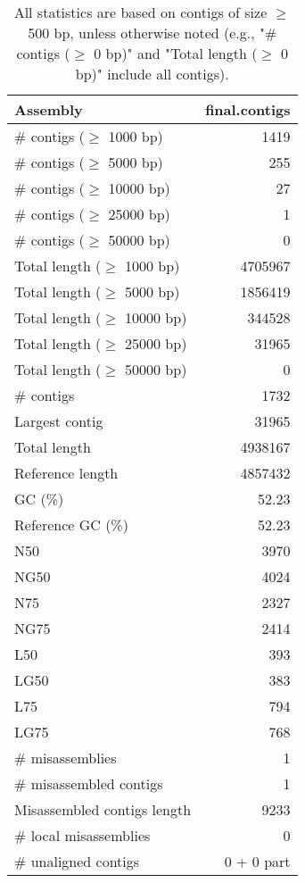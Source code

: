 \documentclass[12pt,a4paper]{article}
\begin{document}
\begin{table}[ht]
\begin{center}
\caption{All statistics are based on contigs of size $\geq$ 500 bp, unless otherwise noted (e.g., "\# contigs ($\geq$ 0 bp)" and "Total length ($\geq$ 0 bp)" include all contigs).}
\begin{tabular}{|l*{1}{|r}|}
\hline
Assembly & final.contigs \\ \hline
\# contigs ($\geq$ 1000 bp) & 1419 \\ \hline
\# contigs ($\geq$ 5000 bp) & 255 \\ \hline
\# contigs ($\geq$ 10000 bp) & 27 \\ \hline
\# contigs ($\geq$ 25000 bp) & 1 \\ \hline
\# contigs ($\geq$ 50000 bp) & 0 \\ \hline
Total length ($\geq$ 1000 bp) & 4705967 \\ \hline
Total length ($\geq$ 5000 bp) & 1856419 \\ \hline
Total length ($\geq$ 10000 bp) & 344528 \\ \hline
Total length ($\geq$ 25000 bp) & 31965 \\ \hline
Total length ($\geq$ 50000 bp) & 0 \\ \hline
\# contigs & 1732 \\ \hline
Largest contig & 31965 \\ \hline
Total length & 4938167 \\ \hline
Reference length & 4857432 \\ \hline
GC (\%) & 52.23 \\ \hline
Reference GC (\%) & 52.23 \\ \hline
N50 & 3970 \\ \hline
NG50 & 4024 \\ \hline
N75 & 2327 \\ \hline
NG75 & 2414 \\ \hline
L50 & 393 \\ \hline
LG50 & 383 \\ \hline
L75 & 794 \\ \hline
LG75 & 768 \\ \hline
\# misassemblies & 1 \\ \hline
\# misassembled contigs & 1 \\ \hline
Misassembled contigs length & 9233 \\ \hline
\# local misassemblies & 0 \\ \hline
\# unaligned contigs & 0 + 0 part \\ \hline

\end{tabular}
\end{center}
\end{table}
\end{document}
